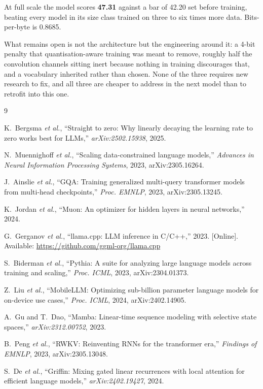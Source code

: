 \documentclass[conference]{IEEEtran}
\begin{document}
At full scale the model scores \textbf{47.31} against a bar of 42.20 set before
training, beating every model in its size class trained on three to six times
more data. Bits-per-byte is 0.8685.

What remains open is not the architecture but the engineering around it: a 4-bit
penalty that quantisation-aware training was meant to remove, roughly half the
convolution channels sitting inert because nothing in training discourages that,
and a vocabulary inherited rather than chosen. None of the three requires new
research to fix, and all three are cheaper to address in the next model than to
retrofit into this one.

\begin{thebibliography}{9}

K.~Bergsma \emph{et al.}, ``Straight to zero: Why linearly decaying the learning
rate to zero works best for LLMs,'' \emph{arXiv:2502.15938}, 2025.

N.~Muennighoff \emph{et al.}, ``Scaling data-constrained language models,''
\emph{Advances in Neural Information Processing Systems}, 2023,
arXiv:2305.16264.

J.~Ainslie \emph{et al.}, ``GQA: Training generalized multi-query transformer
models from multi-head checkpoints,'' \emph{Proc. EMNLP}, 2023,
arXiv:2305.13245.

K.~Jordan \emph{et al.}, ``Muon: An optimizer for hidden layers in neural
networks,'' 2024.

G.~Gerganov \emph{et al.}, ``llama.cpp: LLM inference in C/C++,'' 2023.
[Online]. Available: \url{https://github.com/ggml-org/llama.cpp}

S.~Biderman \emph{et al.}, ``Pythia: A suite for analyzing large language models
across training and scaling,'' \emph{Proc. ICML}, 2023, arXiv:2304.01373.

Z.~Liu \emph{et al.}, ``MobileLLM: Optimizing sub-billion parameter language
models for on-device use cases,'' \emph{Proc. ICML}, 2024, arXiv:2402.14905.

A.~Gu and T.~Dao, ``Mamba: Linear-time sequence modeling with selective state
spaces,'' \emph{arXiv:2312.00752}, 2023.

B.~Peng \emph{et al.}, ``RWKV: Reinventing RNNs for the transformer era,''
\emph{Findings of EMNLP}, 2023, arXiv:2305.13048.

S.~De \emph{et al.}, ``Griffin: Mixing gated linear recurrences with local
attention for efficient language models,'' \emph{arXiv:2402.19427}, 2024.

\end{thebibliography}
\end{document}
